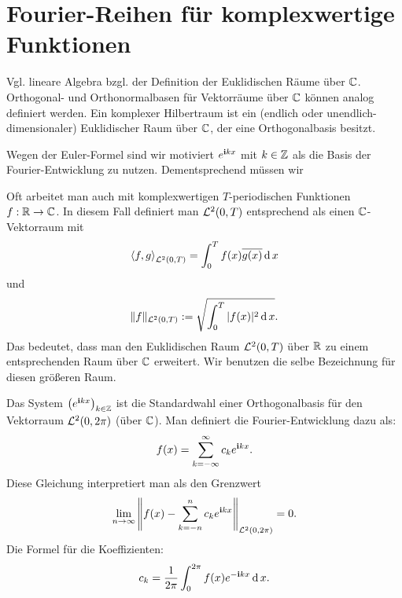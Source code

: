 \section{Fourier-Reihen für komplexwertige Funktionen} 

\begin{bem}
	Vgl. lineare Algebra bzgl. der Definition der Euklidischen Räume über $\mathbb{C}$. Orthogonal- und Orthonormalbasen für Vektorräume über $\mathbb{C}$ können analog definiert werden. Ein komplexer Hilbertraum ist ein (endlich oder unendlich-dimensionaler) Euklidischer Raum über $\mathbb{C}$, der eine Orthogonalbasis besitzt. 
\end{bem} 

\begin{bem}
	Wegen der Euler-Formel sind wir motiviert $e^{\mathbf{i} k x}$ mit $k \in \mathbb{Z}$ als die Basis der Fourier-Entwicklung zu nutzen. Dementsprechend müssen wir 
\end{bem}


\begin{bem} 
	Oft arbeitet  man auch mit komplexwertigen $T$-periodischen Funktionen $ f: \mathbb{R} \to \mathbb{C}$. In diesem Fall definiert man $\mathcal{L}^2(0,T)$ entsprechend als einen $\mathbb{C}$-Vektorraum mit 
	\[
	\left< f , g \right>_{\mathcal{L}^2(0,T)} = \int_0^T f(x) \overline{ g(x) } \operatorname{d} x 
	\]
	und 
	\[
	\|f \|_{\mathcal{L}^2(0,T)} := \sqrt{ \int_0^T |f(x)|^2 \operatorname{d} x}.
	\]
	Das bedeutet, dass man den Euklidischen Raum $\mathcal{L}^2(0,T)$ über $\mathbb{R}$ zu einem entsprechenden Raum über $\mathbb{C}$ erweitert. Wir benutzen die selbe Bezeichnung für diesen größeren Raum. 
\end{bem} 


\begin{bem}
	Das System $\bigl( e^{\mathbf{i} k x} \bigr)_{k \in \mathbb{Z}}$
	ist die Standardwahl einer Orthogonalbasis für den Vektorraum $\mathcal{L}^2(0,2 \pi)$ (über $\mathbb{C}$). Man definiert die Fourier-Entwicklung dazu als: 
	\[
		f(x) = \sum_{k=-\infty}^{\infty} c_k e^{\mathbf{i} k x}.
	\]
	Diese Gleichung interpretiert man als den Grenzwert
	\[
		\lim_{n \to \infty} \left\| f(x) -   \sum_{k=-n}^{n} c_k e^{\mathbf{i} k x}\right\|_{\mathcal{L}^2(0,2 \pi)}  = 0.
	\]
	Die Formel für die Koeffizienten: 
	\[
		c_k = \frac{1}{2\pi} \int_0^{2\pi} f(x) e^{-\mathbf{i} k x} \operatorname{d} x. 
	\]
\end{bem} 

